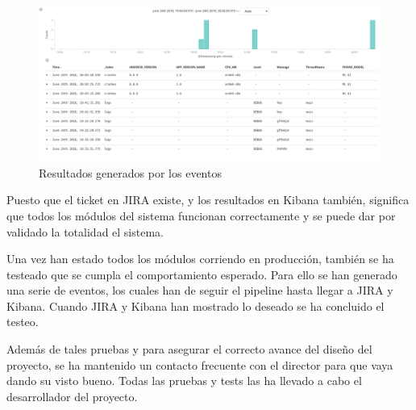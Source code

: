 \begin{figure}[H]
	\centering
	\includegraphics[scale=0.5, width=\linewidth] {kibana.png}
	\caption{Resultados generados por los eventos}
	\label{fig:kibana}
\end{figure}

Puesto que el ticket en JIRA existe, y los resultados en Kibana también, significa que todos los módulos del sistema funcionan correctamente y se puede dar por validado la totalidad el sistema.

Una vez han estado todos los módulos corriendo en producción, también se ha testeado que se cumpla el comportamiento esperado. Para ello se han generado una serie de eventos, los cuales han de seguir el pipeline hasta llegar a JIRA y Kibana. Cuando JIRA y Kibana han mostrado lo deseado se ha concluido el testeo.

Además de tales pruebas y para asegurar el correcto avance del diseño del proyecto, se ha mantenido un contacto frecuente con el director para que vaya dando su visto bueno. Todas las pruebas y tests las ha llevado a cabo el desarrollador del proyecto.